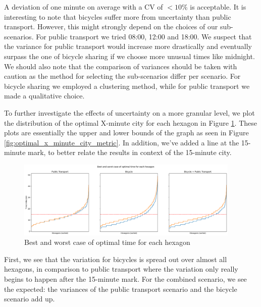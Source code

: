 A deviation of one minute on average with a CV of $<10\%$ is acceptable.
It is interesting to note that bicycles suffer more from uncertainty than public transport. 
However, this might strongly depend on the choices of our sub-scenarios. 
For public transport we tried 08:00, 12:00 and 18:00.
We suspect that the variance for public transport would increase more drastically and eventually surpass the one of bicycle sharing if we choose more unusual times like midnight.
We should also note that the comparison of variances should be taken with caution as the method for selecting the sub-scenarios differ per scenario.
For bicycle sharing we employed a clustering method, while for public transport we made a qualitative choice. 


To further investigate the effects of uncertainty on a more granular level, we plot the distribution of the optimal X-minute city for each hexagon in Figure \ref{fig:best_and_worst_case_of_optimal_time_for_each_hexagon}.
These plots are essentially the upper and lower bounds of the graph as seen in Figure \ref{fig:optimal_x_minute_city_metric}.
In addition, we've added a line at the 15-minute mark, to better relate the results in context of the 15-minute city.


\begin{figure}
  \begin{center}
    \includegraphics[width=0.95\textwidth]{Figures/results/uncertainty/optimal_best_worst_case}
  \end{center}
  \caption{Best and worst case of optimal time for each hexagon}
  \label{fig:best_and_worst_case_of_optimal_time_for_each_hexagon}
\end{figure}

First, we see that the variation for bicycles is spread out over almost all hexagons, in comparison to public transport where the variation only really begins to happen after the 15-minute mark.
For the combined scenario, we see the expected: the variances of the public transport scenario and the bicycle scenario add up.

